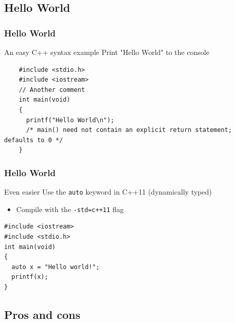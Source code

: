 \documentclass[compress]{beamer}
\begin{document}
\subsection{Hello World}

\begin{frame}[fragile]
	\frametitle{Hello World}
	\begin{exampleblock}{An easy C++ syntax example}
		Print "Hello World" to the console
	\end{exampleblock}
	\begin{lstlisting}
	#include <stdio.h>
	#include <iostream>
	// Another comment
	int main(void)
	{
	  printf("Hello World\n");
	  /* main() need not contain an explicit return statement; defaults to 0 */
	}
	\end{lstlisting}
\end{frame}


\begin{frame}[fragile]
	\frametitle{Hello World}
	\begin{exampleblock}{Even easier}
Use the \texttt{auto} keyword in C++11 (dynamically typed) 
\begin{itemize}
\item Compile with the \texttt{-std=c++11} flag
\end{itemize}
	\end{exampleblock}
\begin{lstlisting}
#include <iostream>
#include <stdio.h>
int main(void)
{
  auto x = "Hello world!";
  printf(x);
}
\end{lstlisting}
\end{frame}

\subsection{Pros and cons}
\end{document}
